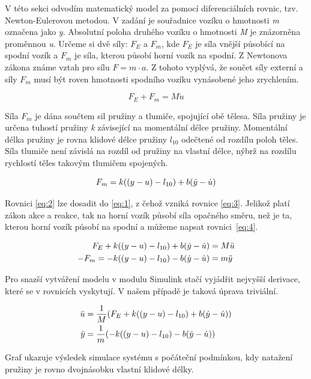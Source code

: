 V této sekci odvodím matematický model za pomocí diferenciálních rovnic, tzv. Newton-Eulerovou metodou. V zadání je souřadnice vozíku o hmotnosti \textit{m} označena jako \textit{y}. Absolutní poloha druhého vozíku o hmotnosti \textit{M} je znázorněna proměnnou \textit{u}. Určeme si dvě síly: \( F_E \) a \( F_m \), kde \( F_E \) je síla vnější působící na spodní vozík a \( F_m \) je síla, kterou působí horní vozík na spodní. Z Newtonova zákona známe vztah pro sílu \( F = m \cdot a \). Z tohoto vyplývá, že součet síly externí a síly \( F_m \) musí být roven hmotnosti spodního vozíku vynásobené jeho zrychlením.

\begin{equation} \label{eq:1}
   F_E + F_m = M \ddot{u} 
\end{equation}

Síla \( F_m \) je dána součtem sil pružiny a tlumiče, spojující obě tělesa. Síla pružiny je určena tuhostí pružiny \textit{k} závisející na momentální délce pružiny. Momentální délka pružiny je rovna klidové délce pružiny \( l_{10} \) odečtené od rozdílu poloh těles. Síla tlumiče není závislá na rozdíl od pružiny na vlastní délce, nýbrž na rozdílu rychlostí těles takovým tlumičem spojených.

\begin{equation} \label{eq:2}
    F_m = k((y - u) - l_{10}) + b(\dot{y} - \dot{u})
\end{equation}

Rovnici \ref{eq:2} lze dosadit do \ref{eq:1}, z čehož vzniká rovnice \ref{eq:3}. Jelikož platí zákon akce a reakce, tak na horní vozík působí síla opačného směru, než je ta, kterou horní vozík působí na spodní a můžeme napsat rovnici~\ref{eq:4}.

\begin{align}
    F_E + k((y - u) - l_{10}) + b(\dot{y} - \dot{u}) &= M \ddot{u} \label{eq:3} \\
    - F_m = - k((y - u) - l_{10}) - b(\dot{y} - \dot{u}) &= m \ddot{y} \label{eq:4}
\end{align}

Pro snazší vytváření modelu v modulu Simulink stačí vyjádřit nejvyšší derivace, které se v rovnicích vyskytují. V našem případě je taková úprava triviální.

\begin{align*}
    \ddot{u} &= \dfrac{1}{M} ( F_E + k((y - u) - l_{10}) + b(\dot{y} - \dot{u}) ) \\
    \ddot{y} &= \dfrac{1}{m} ( - k((y - u) - l_{10}) - b(\dot{y} - \dot{u}) )
\end{align*}

Graf ukazuje výsledek simulace systému s počáteční podmínkou, kdy natažení pružiny je rovno dvojnásobku vlastní klidové délky.

